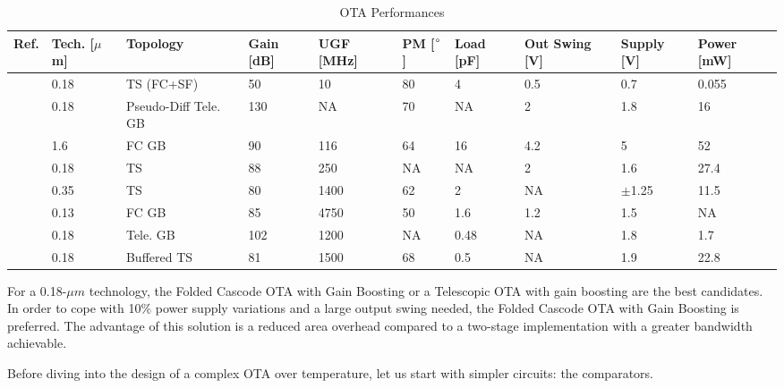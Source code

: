 \begin{table}[htp]
	\caption{OTA Performances}
	\centering
	\label{table:ota_comparison_table}
	\begin{tabular}{L{5\charwidth} L{4.2\charwidth} L{11\charwidth} R{4.5\charwidth} R{4.5\charwidth} R{3.5\charwidth} R{4.5\charwidth} C{9\charwidth} C{6.2\charwidth} C{5.5\charwidth}}
	\toprule
	Ref. & Tech. [\(\mu \)m] & Topology & Gain [dB] & UGF [MHz] & PM [\(\degree \)] & Load [pF] & Out Swing [V] & Supply [V] & Power [mW] \\
    \midrule
    \cite{Sauerbrey2002}  & 0.18 & TS (FC+SF\footnotemark[1]) & 50  &   10 & 80 & 4    & 0.5 & 0.7 & 0.055 \\
    \cite{Chiu2004}       & 0.18 & Pseudo-Diff Tele. GB       & 130 &   NA & 70 &   NA & 2\footnotemark[2] & 1.8 & 16 \\
    \cite{Bult1991}       &  1.6 & FC GB                      & 90  &  116 & 64 & 16   & 4.2 & 5 & 52 \\
    \cite{Miyahara2014}   & 0.18 & TS                         & 88  &  250 & NA &   NA & 2\footnotemark[2] & 1.6 & 27.4 \\
    \cite{Thandri2006}    & 0.35 & TS                         & 80  & 1400 & 62 &  2   & NA & \(\pm \)1.25 & 11.5 \\
    \cite{Zhang2015PRIME} & 0.13 & FC GB                      & 85  & 4750 & 50 &  1.6 & 1.2 & 1.5 & NA \\
    \cite{Liu2015OpAmp}   & 0.18 & Tele. GB                   & 102 & 1200 & NA & 0.48 & NA  & 1.8 & 1.7 \\
    \cite{Sun2016}        & 0.18 & Buffered TS                & 81  & 1500 & 68 &  0.5 & NA  & 1.9 & 22.8 \\
	\bottomrule
	\end{tabular}
\end{table}

For a 0.18-$\mu m$ technology, the Folded Cascode OTA with Gain Boosting or a Telescopic OTA with gain boosting are the best candidates. In order to cope with 10\% power supply variations and a large output swing needed, the Folded Cascode OTA with Gain Boosting is preferred.
The advantage of this solution is a reduced area overhead compared to a two-stage implementation with a greater bandwidth achievable.

Before diving into the design of a complex OTA over temperature, let us start with simpler circuits: the comparators.


